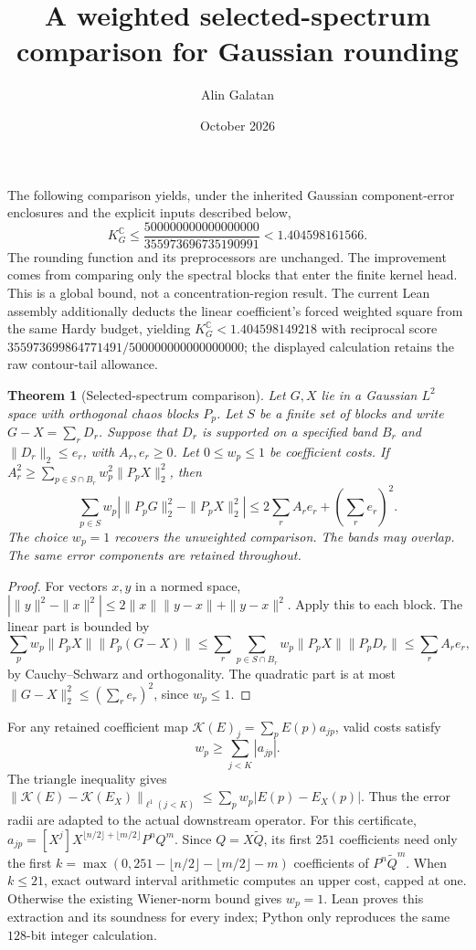 \documentclass[11pt]{article}
\title{A weighted selected-spectrum comparison for Gaussian rounding}
\author{Alin Galatan}
\date{October 2026}
\newtheorem{theorem}{Theorem}
\begin{document}
\maketitle

The following comparison yields, under the inherited Gaussian component-error
enclosures and the explicit inputs described below,
\[
 K_G^{\mathbb C}\le
 \frac{500000000000000000}{355973696735190991}
 <1.404598161566.
\]
The rounding function and its preprocessors are unchanged. The improvement
comes from comparing only the spectral blocks that enter the finite kernel
head. This is a global bound, not a concentration-region result.
The current Lean assembly additionally deducts the linear coefficient's forced
weighted square from the same Hardy budget, yielding
$K_G^{\mathbb C}<1.404598149218$ with reciprocal score
$355973699864771491/500000000000000000$; the displayed calculation retains
the raw contour-tail allowance.

\begin{theorem}[Selected-spectrum comparison]
Let $G,X$ lie in a Gaussian $L^2$ space with orthogonal chaos blocks $P_p$.
Let $S$ be a finite set of blocks and write $G-X=\sum_r D_r$. Suppose that
$D_r$ is supported on a specified band $B_r$ and $\|D_r\|_2\le e_r$,
with $A_r,e_r\ge0$. Let $0\le w_p\le1$ be coefficient costs.
If $A_r^2\ge\sum_{p\in S\cap B_r}w_p^2\|P_pX\|_2^2$, then
\[
 \sum_{p\in S}w_p\left|\|P_pG\|_2^2-\|P_pX\|_2^2\right|
 \le 2\sum_r A_re_r+\left(\sum_r e_r\right)^2.
\]
The choice $w_p=1$ recovers the unweighted comparison. The bands may overlap. The same error components are retained throughout.
\end{theorem}
\begin{proof}
For vectors $x,y$ in a normed space,
$|\|y\|^2-\|x\|^2|\le2\|x\|\|y-x\|+\|y-x\|^2$.
Apply this to each block. The linear part is bounded by
\[
 \sum_p w_p\|P_pX\|\|P_p(G-X)\|
 \le\sum_r\sum_{p\in S\cap B_r}w_p\|P_pX\|\|P_pD_r\|
 \le\sum_r A_re_r,
\]
by Cauchy--Schwarz and orthogonality. The quadratic part is at most
$\|G-X\|_2^2\le(\sum_r e_r)^2$, since $w_p\le1$.
\end{proof}

For any retained coefficient map
$\mathcal K(E)_j=\sum_p E(p)a_{jp}$, valid costs satisfy
\[
 w_p\ge\sum_{j<K}|a_{jp}|.
\]
The triangle inequality gives
$\|\mathcal K(E)-\mathcal K(E_X)\|_{\ell^1(j<K)}
\le\sum_p w_p|E(p)-E_X(p)|$.
Thus the error radii are adapted to the actual downstream operator.
For this certificate, $a_{jp}=[X^j]X^{\lfloor n/2\rfloor+\lfloor m/2\rfloor}P^nQ^m$.
Since $Q=X\widetilde Q$, its first $251$ coefficients need only the first
$k=\max(0,251-\lfloor n/2\rfloor-\lfloor m/2\rfloor-m)$ coefficients of
$P^n\widetilde Q^m$. When $k\le21$, exact outward interval arithmetic computes
an upper cost, capped at one. Otherwise the existing Wiener-norm bound gives
$w_p=1$. Lean proves this extraction and its soundness for every index; Python
only reproduces the same $128$-bit integer calculation.
\end{document}
